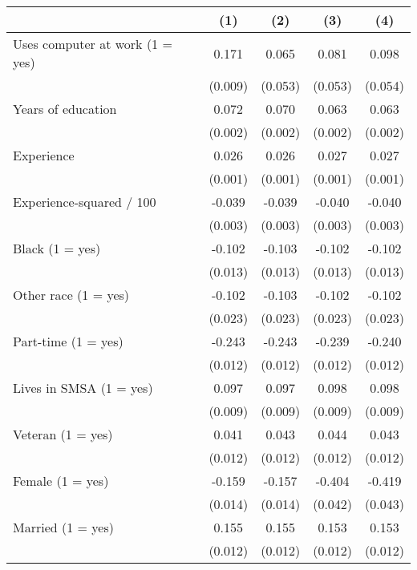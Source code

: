 \begin{tabular}{l*{4}{c}}
\hline\hline
            &\multicolumn{1}{c}{(1)}&\multicolumn{1}{c}{(2)}&\multicolumn{1}{c}{(3)}&\multicolumn{1}{c}{(4)}\\
\hline
Uses computer at work (1 = yes)&       0.171&       0.065&       0.081&       0.098\\
            &     (0.009)&     (0.053)&     (0.053)&     (0.054)\\
Years of education&       0.072&       0.070&       0.063&       0.063\\
            &     (0.002)&     (0.002)&     (0.002)&     (0.002)\\
Experience  &       0.026&       0.026&       0.027&       0.027\\
            &     (0.001)&     (0.001)&     (0.001)&     (0.001)\\
Experience-squared / 100&      -0.039&      -0.039&      -0.040&      -0.040\\
            &     (0.003)&     (0.003)&     (0.003)&     (0.003)\\
Black (1 = yes)&      -0.102&      -0.103&      -0.102&      -0.102\\
            &     (0.013)&     (0.013)&     (0.013)&     (0.013)\\
Other race (1 = yes)&      -0.102&      -0.103&      -0.102&      -0.102\\
            &     (0.023)&     (0.023)&     (0.023)&     (0.023)\\
Part-time (1 = yes)&      -0.243&      -0.243&      -0.239&      -0.240\\
            &     (0.012)&     (0.012)&     (0.012)&     (0.012)\\
Lives in SMSA (1 = yes)&       0.097&       0.097&       0.098&       0.098\\
            &     (0.009)&     (0.009)&     (0.009)&     (0.009)\\
Veteran (1 = yes)&       0.041&       0.043&       0.044&       0.043\\
            &     (0.012)&     (0.012)&     (0.012)&     (0.012)\\
Female (1 = yes)&      -0.159&      -0.157&      -0.404&      -0.419\\
            &     (0.014)&     (0.014)&     (0.042)&     (0.043)\\
Married (1 = yes)&       0.155&       0.155&       0.153&       0.153\\
            &     (0.012)&     (0.012)&     (0.012)&     (0.012)\\

\end{tabular}
